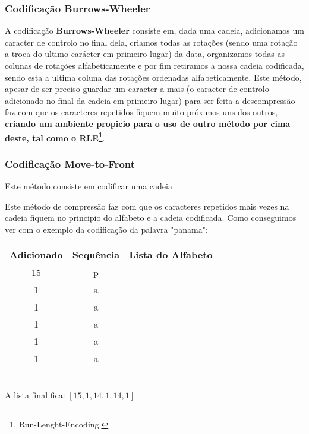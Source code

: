 \documentclass[11pt,journal,compsoc]{IEEEtran}
\begin{document}
\subsubsection{Codificação \textbf{Burrows-Wheeler}}
A codificação \textbf{Burrows-Wheeler} consiste em, dada uma cadeia, adicionamos um caracter de controlo no final dela, criamos todas as rotações (sendo uma rotação a troca do ultimo carácter em primeiro lugar) da data, organizamos todas as colunas de rotações alfabeticamente e por fim retiramos a nossa cadeia codificada, sendo esta a ultima coluna das rotações ordenadas alfabeticamente.
Este método, apesar de ser preciso guardar um caracter a mais (o caracter de controlo adicionado no final da cadeia em primeiro lugar) para ser feita a descompressão faz com que os caracteres repetidos fiquem muito próximos uns dos outros, \textbf{criando um ambiente propicio para o uso de outro método por cima deste, tal como o RLE\footnote{Run-Lenght-Encoding.}}.



\subsubsection{Codificação \textbf{Move-to-Front}}
Este método consiste em codificar uma cadeia 

Este método de compressão faz com que os caracteres repetidos mais vezes na cadeia fiquem no principio do alfabeto e a cadeia codificada. Como conseguimos ver com o exemplo da codificação da palavra "panama":
\begin{center}
\begin{tabular}{ |c|c|c| } 
  \hline
  Adicionado & Sequência & Lista do Alfabeto\\
  \hline
  15 & p \\
  \hline
  1 & a \\
  \hline
  1 & a \\
  \hline
  1 & a \\
  \hline
  1 & a \\
  \hline
  1 & a \\
  \hline
\end{tabular}
\\
A lista final fica:
$[15,1,14,1,14,1]$
\end{center}
\end{document}
